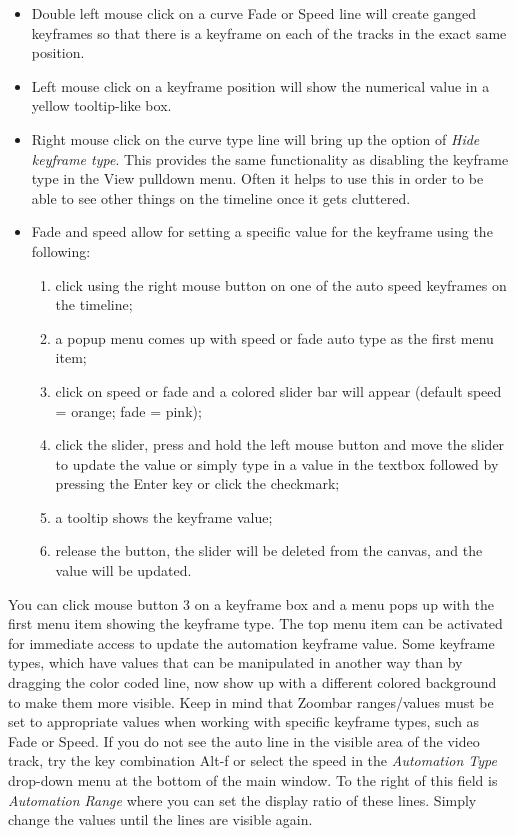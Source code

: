 \begin{itemize}
    \item Double left mouse click on a curve Fade or Speed line will create ganged keyframes so that there is a
    keyframe on each of the tracks in the exact same position.
    \item Left mouse click on a keyframe position will show the numerical value in a yellow tooltip-like box.
    \item Right mouse click on the curve type line will bring up the option of \textit{Hide keyframe type}.   This
    provides the same functionality as disabling the keyframe type in the View pulldown menu.  Often it
    helps to use this in order to be able to see other things on the timeline once it gets cluttered.
    \item Fade and speed allow for setting a specific value for the keyframe using the following:
    \begin{enumerate}
        \item click using the right mouse button on one of the auto speed keyframes on the timeline;
        \item a popup menu comes up with speed or fade auto type as the first menu item;
        \item click on speed or fade and a colored slider bar will appear (default speed = orange; fade = pink);
        \item click the slider, press and hold the left mouse button and move the slider to update the value or
        simply type in a value in the textbox followed by pressing the Enter key or click the checkmark;
        \item a tooltip shows the keyframe value;
        \item release the button, the slider will be deleted from the canvas, and the value will be updated.
    \end{enumerate}
\end{itemize}

You can click mouse button 3 on a keyframe box and a menu pops up with the first menu item showing the keyframe type.  The top menu item can be activated for immediate access to update the automation keyframe value.  Some keyframe types, which have values that can be manipulated in another way than by dragging the color coded line, now show up with a different colored background to make them more visible.  Keep in mind that Zoombar ranges/values must be set to appropriate values when working with specific keyframe types, such as Fade or Speed.  If you do not see the auto line in the visible area of the video track, try the key combination Alt-f or select the speed in the \textit{Automation Type} drop-down menu at the bottom of the main window.  To the right of this field is \textit{Automation Range} where you can set the display ratio of these lines. Simply change the values until the lines are visible again.

